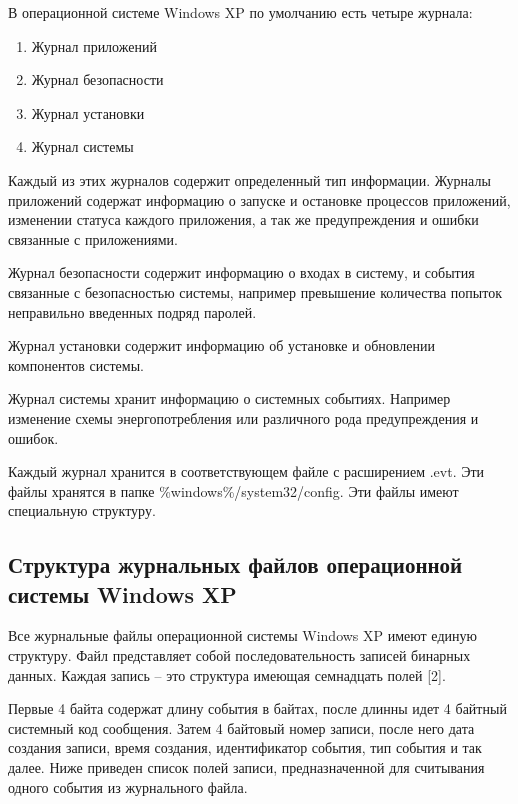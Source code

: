 В операционной системе Windows XP по умолчанию есть четыре журнала:

\begin{enumerate}
\item Журнал приложений
\item Журнал безопасности
\item Журнал установки
\item Журнал системы
\end{enumerate}

Каждый из этих журналов содержит определенный тип информации. Журналы приложений содержат информацию о запуске и остановке процессов приложений, изменении статуса каждого приложения, а так же предупреждения и ошибки связанные с приложениями. 

Журнал безопасности содержит информацию о входах в систему, и события связанные с безопасностью системы, например превышение количества попыток неправильно введенных подряд паролей. 

Журнал установки содержит информацию об установке и обновлении компонентов системы. 

Журнал системы хранит информацию о системных событиях. Например изменение схемы энергопотребления или различного рода предупреждения и ошибок. 

Каждый журнал хранится в соответствующем файле с расширением .evt. Эти файлы хранятся в папке \%windows\%/system32/config. Эти файлы имеют специальную структуру. 

\subsection{Структура журнальных файлов операционной системы Windows XP}

Все журнальные файлы операционной системы Windows XP имеют единую структуру. Файл представляет собой последовательность записей бинарных данных. Каждая запись – это структура имеющая семнадцать полей [2]. 

Первые 4 байта содержат длину события в байтах, после длинны идет 4 байтный системный код сообщения. Затем 4 байтовый номер записи, после него дата создания записи, время создания, идентификатор события, тип события и так далее. Ниже приведен список полей записи, предназначенной для считывания одного события из журнального файла. 

